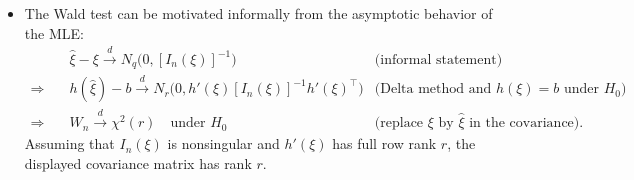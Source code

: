 \documentclass{article}
\theoremstyle{break}
\begin{document}
\begin{itemize}
    \item The Wald test can be motivated informally from the asymptotic behavior of the MLE:
    \begin{align*}
        & \hat\xi-\xi
        \stackrel{d}{\to}
        N_q\big(0,[I_n(\xi)]^{-1}\big)
        &\text{(informal statement)}\\
        \Rightarrow\quad
        & h(\hat\xi)-b
        \stackrel{d}{\to}
        N_r\big(0,h'(\xi)[I_n(\xi)]^{-1}h'(\xi)^\top\big)
        &\text{(Delta method and $h(\xi)=b$ under $H_0$)}\\
        \Rightarrow\quad
        & W_n\stackrel{d}{\to}\chi^2(r)
        \quad\text{under $H_0$}
        &\text{(replace $\xi$ by $\hat\xi$ in the covariance).}
    \end{align*}
    Assuming that $I_n(\xi)$ is nonsingular and $h'(\xi)$ has full row rank $r$, the displayed covariance matrix has rank $r$.


\end{itemize}
\end{document}
